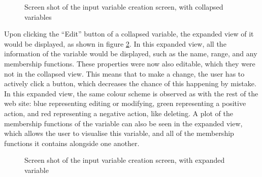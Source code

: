 \begin{figure}[ht!]
	\begin{center}
	\end{center}
	\vspace{-6mm}
	\caption{Screen shot of the input variable creation screen, with collapsed variables}
	\label{fig:ss-ui-1}
	\vspace{-10mm}
\end{figure}
\noindent
Upon clicking the ``Edit'' button of a collapsed variable, the expanded view of it would be displayed, as shown in figure \ref{fig:ss-ui-2}. In this expanded view, all the information of the variable would be displayed, such as the name, range, and any membership functions. These properties were now also editable, which they were not in the collapsed view. This means that to make a change, the user has to actively click a button, which decreases the chance of this happening by mistake. In this expanded view, the same colour scheme is observed as with the rest of the web site: blue representing editing or modifying, green representing a positive action, and red representing a negative action, like deleting. A plot of the membership functions of the variable can also be seen in the expanded view, which allows the user to visualise this variable, and all of the membership functions it contains alongside one another.
\begin{figure}[ht!]
	\begin{center}
	\end{center}
	\vspace{-6mm}
	\caption{Screen shot of the input variable creation screen, with expanded variable}
	\label{fig:ss-ui-2}
\end{figure}

